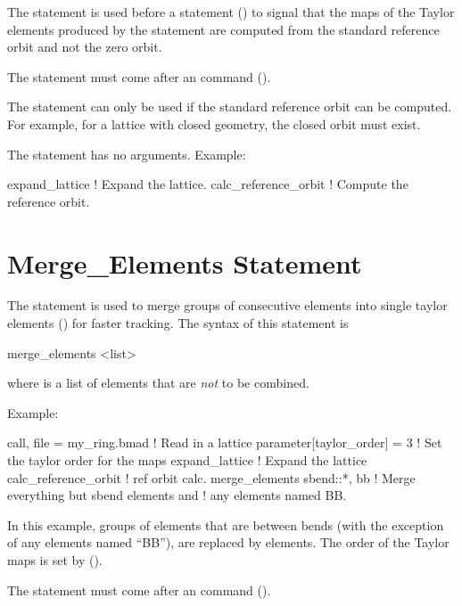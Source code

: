 {{{{{The  statement is used before a  statement
() to signal that the maps of the Taylor elements produced by the
 statement are computed from the standard reference orbit and not the zero
orbit.

The  statement must come after an  command
().

The  statement can only be used if the standard reference orbit can
be computed. For example, for a lattice with closed geometry, the closed orbit must exist.

The  statement has no arguments. Example:
\begin{example}
  expand_lattice          ! Expand the lattice.
  calc_reference_orbit    ! Compute the reference orbit.
\end{example}

\section{Merge_Elements Statement}
\label{s:merge.eles}

The  statement is used to merge groups of consecutive elements into single
taylor elements () for faster tracking. The syntax of this statement is
\begin{example}
  merge_elements <list>
\end{example}
where  is a list of elements that are {\em not} to be combined.

Example:
\begin{example}
  call, file = my_ring.bmad     ! Read in a lattice
  parameter[taylor_order] = 3   ! Set the taylor order for the maps
  expand_lattice                ! Expand the lattice
  calc_reference_orbit          ! ref orbit calc.
  merge_elements sbend::*, bb ! Merge everything but sbend elements and 
                                !   any elements named BB.
\end{example}
In this example, groups of elements that are between bends (with the exception of any elements named
``BB''), are replaced by  elements. The order of the Taylor maps is set by
 ().

The  statement must come after an  command
().

}}}}}
